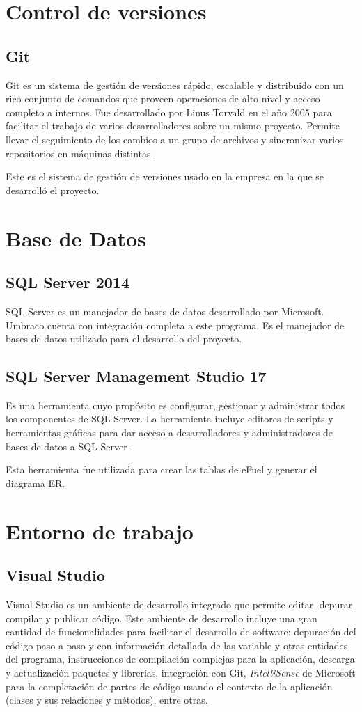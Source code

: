 \section{Control de versiones}
\subsection{Git}
Git \cite{gitGit} es un sistema de gestión de versiones rápido, escalable y distribuido con un rico conjunto de comandos que proveen operaciones de alto nivel y acceso completo a internos. Fue desarrollado por Linus Torvald en el año 2005 para facilitar el trabajo de varios desarrolladores sobre un mismo proyecto. Permite llevar el seguimiento de los cambios a un grupo de archivos y sincronizar varios repositorios en máquinas distintas.

Este es el sistema de gestión de versiones usado en la empresa en la que se desarrolló el proyecto.

\section{Base de Datos}
\subsection{SQL Server 2014}
SQL Server \cite{SQLServerMicrosoft} es un manejador de bases de datos desarrollado por Microsoft. Umbraco cuenta con integración completa a este programa. Es el manejador de bases de datos utilizado para el desarrollo del proyecto.

\subsection{SQL Server Management Studio 17}
Es una herramienta cuyo propósito es configurar, gestionar y administrar todos los componentes de SQL Server. La herramienta incluye editores de scripts y herramientas gráficas para dar acceso a desarrolladores y administradores de bases de datos a SQL Server \cite{SSMSMicrosoft}.

Esta herramienta fue utilizada para crear las tablas de eFuel y generar el diagrama ER.

\section{Entorno de trabajo}
\subsection{Visual Studio} \label{visualStudio}
Visual Studio \cite{visualStudioMicrosoft} es un ambiente de desarrollo integrado que permite editar, depurar, compilar y publicar código. Este ambiente de desarrollo incluye una gran cantidad de funcionalidades para facilitar el desarrollo de software: depuración del código paso a paso y con información detallada de las variable y otras entidades del programa, instrucciones de compilación complejas para la aplicación, descarga y actualización paquetes y librerías, integración con Git, \textit{IntelliSense} de Microsoft para la completación de partes de código usando el contexto de la aplicación (clases y sus relaciones y métodos), entre otras.

